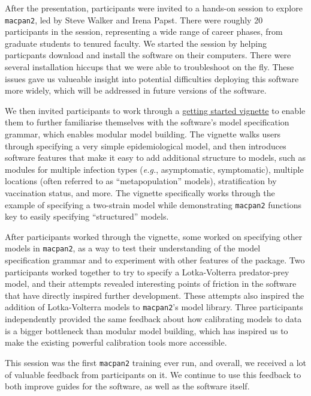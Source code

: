 \documentclass{article}
\newcommand{\macpan}{\texttt{macpan2}\xspace}
\newcommand{\eg}{\textit{e.g.},\xspace}
\begin{document}
  After the presentation, participants were invited to a hands-on session to explore \macpan, led by Steve Walker and Irena Papst. There were roughly 20 participants in the session, representing a wide range of career phases, from graduate students to tenured faculty. We started the session by helping particpants download and install the software on their computers. There were several installation hiccups that we were able to troubleshoot on the fly. These issues gave us valueable insight into potential difficulties deploying this software more widely, which will be addressed in future versions of the software.

  We then invited participants to work through a \href{https://github.com/canmod/macpan2/blob/refactorcpp/vignettes/quickstart.Rmd}{getting started vignette} to enable them to further familiarise themselves with the software's model specification grammar, which enables modular model building. The vignette walks users through specifying a very simple epidemiological model, and then introduces software features that make it easy to add additional structure to models, such as modules for multiple infection types (\eg asymptomatic, symptomatic), multiple locations (often referred to as ``metapopulation'' models), stratification by vaccination status, and more. The vignette specifically works through the example of specifying a two-strain model while demonstrating \macpan functions key to easily specifying ``structured'' models.

  After participants worked through the vignette, some worked on specifying other models in \macpan, as a way to test their understanding of the model specification grammar and to experiment with other features of the package. Two participants worked together to try to specify a Lotka-Volterra predator-prey model, and their attempts revealed interesting points of friction in the software that have directly inspired further development. These attempts also inspired the addition of Lotka-Volterra models to \macpan's model library. Three participants independently provided the same feedback about how calibrating models to data is a bigger bottleneck than modular model building, which has inspired us to make the existing powerful calibration tools more accessible.

  This session was the first \macpan training ever run, and overall, we received a lot of valuable feedback from participants on it. We continue to use this feedback to both improve guides for the software, as well as the software itself.
\end{document}
